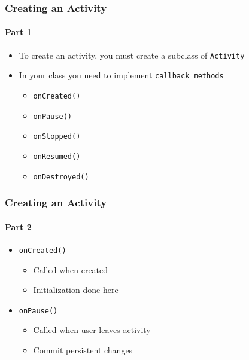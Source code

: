 %
%


\begin{frame}
  \frametitle{Creating an Activity}
  \framesubtitle{Part 1}

  \begin{itemize}
  \item<1-> To create an activity, you must create a subclass of
    \texttt{Activity}

  \item<2-> In your class you need to implement \texttt{callback
      methods}

    \begin{itemize}
    \item<3-> \lstinline{onCreated()}
    \item<4-> \lstinline{onPause()}
    \item<5-> \lstinline{onStopped()}
    \item<6-> \lstinline{onResumed()}
    \item<7-> \lstinline{onDestroyed()}
    \end{itemize}
  \end{itemize}

\end{frame}


\begin{frame}
  \frametitle{Creating an Activity}
  \framesubtitle{Part 2}

  
  \begin{itemize}
  \item<1-> \lstinline{onCreated()}

    \begin{itemize}
    \item<2-> Called when created
    \item<3-> Initialization done here
    \end{itemize}

  \item<4-> \lstinline{onPause()}

    \begin{itemize}
    \item<5-> Called when user leaves activity
    \item<6-> Commit persistent changes
    \end{itemize}

  \end{itemize}

\end{frame}


